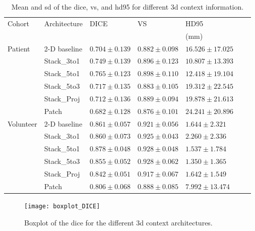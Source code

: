 \begin{table}[htbp]
   \centering
   \caption[Results for 3-D Context]{Mean and \gls{sd} of the \acrlong{dice}, \acrlong{vs}, and \acrlong{hd95} for different \gls{3d} context information.}
   \begin{tabular}{l*{6}{l}}
      \toprule
      Cohort	& Architecture	& DICE				& VS				& HD95\\
      			&					&					&					& (mm)\\
      \midrule
      Patient   & 2-D baseline & $0.704 \pm 0.139$ & $0.882 \pm 0.098$ & $16.526 \pm 17.025$ \\
                & Stack\_3to1  & $0.749 \pm 0.139$ & $0.896 \pm 0.123$ & $\mathbf{10.807 \pm 13.393}$ \\
                & Stack\_5to1  & $\mathbf{0.765 \pm 0.123}$ & $\mathbf{0.898 \pm 0.110}$ & $12.418 \pm 19.104$ \\
                & Stack\_5to3  & $0.717 \pm 0.135$ & $0.883 \pm 0.105$ & $19.312 \pm 22.545$ \\
                & Stack\_Proj  & $0.712 \pm 0.136$ & $0.889 \pm 0.094$ & $19.878 \pm 21.613$ \\
                & Patch & $0.682 \pm 0.128$ & $0.876 \pm 0.101$ & $24.241 \pm 20.896$ \\                
      \midrule
      Volunteer & 2-D baseline & $0.861 \pm 0.057$ & $0.921 \pm 0.056$ & $1.644  \pm 2.321 $ \\
                & Stack\_3to1  & $0.860 \pm 0.073$ & $0.925 \pm 0.043$ & $2.260  \pm 2.336 $ \\
                & Stack\_5to1  & $\mathbf{0.878 \pm 0.048}$ & $\mathbf{0.928 \pm 0.048}$ & $1.537  \pm 1.784 $ \\
                & Stack\_5to3  & $0.855 \pm 0.052$ & $0.928 \pm 0.062$ & $\mathbf{1.350  \pm 1.365} $ \\                
                & Stack\_Proj  & $0.842 \pm 0.051$ & $0.917 \pm 0.067$ & $1.642  \pm 1.549 $ \\
                & Patch & $0.806 \pm 0.068$ & $0.888 \pm 0.085$ & $7.992  \pm 13.474$ \\
      \bottomrule
   \end{tabular}
   \label{tab:results_3d_context_small}
\end{table}

\begin{figure}[htbp]
	\centering
	\texttt{[image: boxplot\_DICE]}
    \caption[Boxplot of the \acrlong{dice} for 3-D context architectures]{Boxplot of the \acrlong{dice} for the different \gls{3d} context architectures.}
    \label{fig:results_boxplot_dice}
\end{figure}

